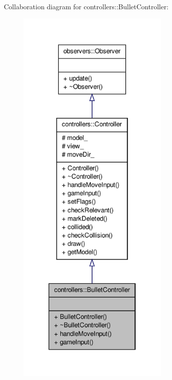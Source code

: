 \-Collaboration diagram for controllers\-:\-:\-Bullet\-Controller\-:
\nopagebreak
\begin{figure}[H]
\begin{center}
\leavevmode
\includegraphics[height=550pt]{d0/d11/classcontrollers_1_1BulletController__coll__graph}
\end{center}
\end{figure}
